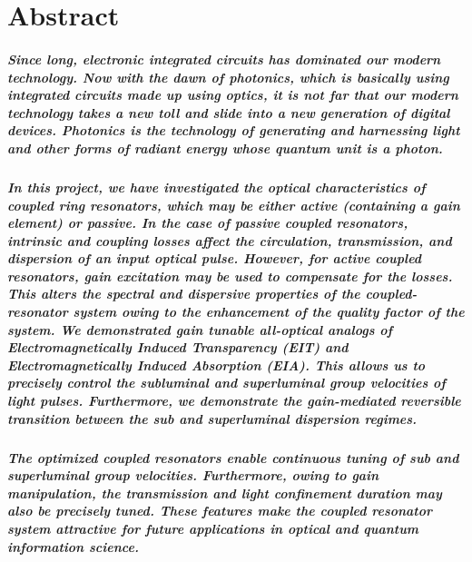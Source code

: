 \documentclass[12pt,twoside]{report}
\begin{document}
\chapter*{{\Large Abstract}}
\paragraph{\normalfont Since long, electronic integrated circuits has dominated our modern technology. Now with the dawn of photonics, which is basically using integrated circuits made up using optics, it is not far that our modern technology takes a new toll and slide into a new generation of digital devices. Photonics is the technology of generating and harnessing light and other forms of radiant energy whose quantum unit is a photon.}  

\paragraph{\normalfont In this project, we have investigated the optical characteristics of coupled ring resonators, which may be either active (containing a gain element) or passive. In the case of passive coupled resonators, intrinsic and coupling losses affect the circulation, transmission, and dispersion of an input optical pulse. However, for active coupled resonators, gain excitation may be used to compensate for the losses. This alters the spectral and dispersive properties of the coupled-resonator system owing to the enhancement of the quality factor of the system. We demonstrated gain tunable all-optical analogs of Electromagnetically Induced Transparency (EIT) and Electromagnetically Induced Absorption (EIA). This allows us to precisely control the subluminal and superluminal group velocities of light pulses. Furthermore, we demonstrate the gain-mediated reversible transition between the sub and superluminal dispersion regimes.}

\paragraph{\normalfont The optimized coupled resonators enable continuous tuning of sub and superluminal group velocities. Furthermore, owing to gain manipulation, the transmission and light confinement duration may also be precisely tuned. These features make the coupled resonator system attractive for future applications in optical and quantum information science.}

\end{document}
